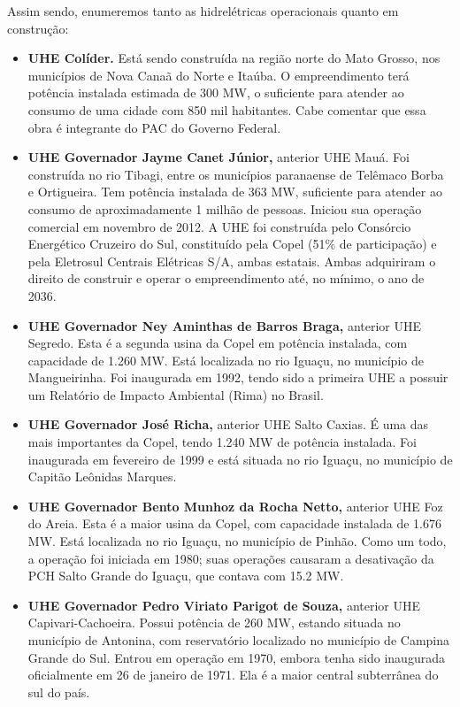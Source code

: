\documentclass[grad,numbers]{coppe}
\providecommand{\tightlist}{%
  \setlength{\itemsep}{0pt}\setlength{\parskip}{0pt}}
\begin{document}
  Assim sendo, enumeremos tanto as hidrelétricas operacionais quanto em construção:
  \begin{itemize}
  \tightlist
  \item
    \textbf{UHE Colíder.} Está sendo construída na região norte do Mato Grosso, nos municípios de Nova Canaã do Norte e Itaúba. O empreendimento terá potência instalada estimada de 300 MW, o suficiente para atender ao consumo de uma cidade com 850 mil habitantes. Cabe comentar que essa obra é integrante do PAC do Governo Federal.
  \item
    \textbf{UHE Governador Jayme Canet Júnior,} anterior UHE Mauá. Foi construída no rio Tibagi, entre os municípios paranaense de Telêmaco Borba e Ortigueira. Tem potência instalada de 363 MW, suficiente para atender ao consumo de aproximadamente 1 milhão de pessoas. Iniciou sua operação comercial em novembro de 2012. A UHE foi construída pelo Consórcio Energético Cruzeiro do Sul, constituído pela Copel (51\% de participação) e pela Eletrosul Centrais Elétricas S/A, ambas estatais. Ambas adquiriram o direito de construir e operar o empreendimento até, no mínimo, o ano de 2036.
  \item
    \textbf{UHE Governador Ney Aminthas de Barros Braga,} anterior UHE Segredo. Esta é a segunda usina da Copel em potência instalada, com capacidade de 1.260 MW. Está localizada no rio Iguaçu, no município de Mangueirinha. Foi inaugurada em 1992, tendo sido a primeira UHE a possuir um Relatório de Impacto Ambiental (Rima) no Brasil.
  \item
    \textbf{UHE Governador José Richa,} anterior UHE Salto Caxias. É uma das mais importantes da Copel, tendo 1.240 MW de potência instalada. Foi inaugurada em fevereiro de 1999 e está situada no rio Iguaçu, no município de Capitão Leônidas Marques.
  \item
    \textbf{UHE Governador Bento Munhoz da Rocha Netto,} anterior UHE Foz do Areia. Esta é a maior usina da Copel, com capacidade instalada de 1.676 MW. Está localizada no rio Iguaçu, no município de Pinhão. Como um todo, a operação foi iniciada em 1980; suas operações causaram a desativação da PCH Salto Grande do Iguaçu, que contava com 15.2 MW.
  \item
    \textbf{UHE Governador Pedro Viriato Parigot de Souza,} anterior UHE Capivari-Cachoeira. Possui potência de 260 MW, estando situada no município de Antonina, com reservatório localizado no município de Campina Grande do Sul. Entrou em operação em 1970, embora tenha sido inaugurada oficialmente em 26 de janeiro de 1971. Ela é a maior central subterrânea do sul do país.

\end{itemize}
\end{document}
